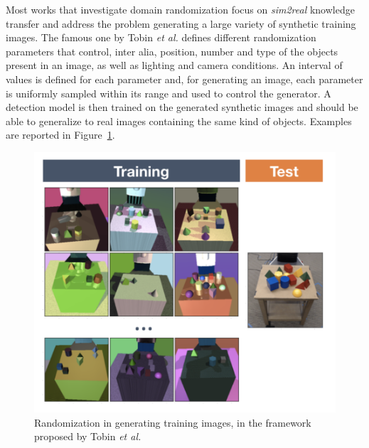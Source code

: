 \documentclass[%
    corpo=12pt,
    twoside,
    stile=classica,   
    tipotesi=magistrale,
    evenboxes,
    english,
	numerazioneromana,
]{toptesi}
\begin{document}
\bigskip
Most works that investigate domain randomization focus on \textit{sim2real} knowledge transfer and address the problem generating a large variety of synthetic training images. The famous one by Tobin \textit{et al.}\cite{tobin2017domain} defines different randomization parameters that control, inter alia, position, number and type of the objects present in an image, as well as lighting and camera conditions. An interval of values is defined for each parameter and, for generating an image, each parameter is uniformly sampled within its range and used to control the generator. A detection model is then trained on the generated synthetic images and should be able to generalize to real images containing the same kind of objects. Examples are reported in Figure~\ref{fig:randomization}.

\begin{figure}[ht!]
	\centering
	\includegraphics[width=0.7\linewidth]{imgs/randomization.png}
	\caption{Randomization in generating training images, in the framework proposed by Tobin \textit{et al.}\cite{tobin2017domain}}
	\label{fig:randomization}
\end{figure}
\end{document}
